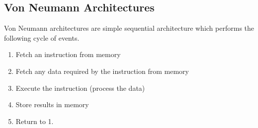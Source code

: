\subsection{Von Neumann Architectures}
	Von Neumann architectures are simple sequential architecture which performs the following cycle of events.
	\begin{enumerate}
		\item Fetch an instruction from memory
		\item Fetch any data required by the instruction from memory
		\item Execute the instruction (process the data)
		\item Store results in memory
		\item Return to 1.
	\end{enumerate}
